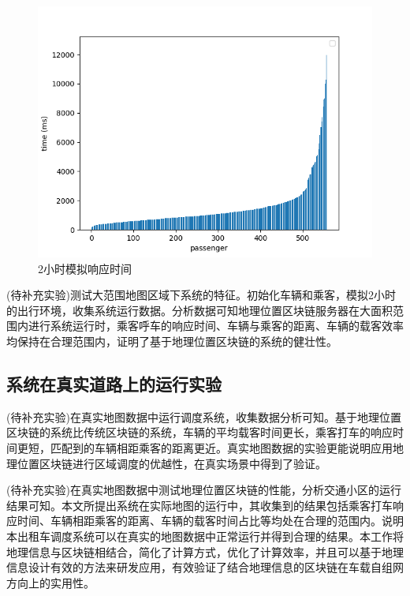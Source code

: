 \begin{figure}
  \centering
  \includegraphics[width=1.0\textwidth]{figures/2hTime}
  \caption{2小时模拟响应时间}\label{fig:2hTime}
\end{figure}

(待补充实验)测试大范围地图区域下系统的特征。初始化车辆和乘客，模拟2小时的出行环境，收集系统运行数据。分析数据可知地理位置区块链服务器在大面积范围内进行系统运行时，乘客呼车的响应时间、车辆与乘客的距离、车辆的载客效率均保持在合理范围内，证明了基于地理位置区块链的系统的健壮性。

\subsection{系统在真实道路上的运行实验}
(待补充实验)在真实地图数据中运行调度系统，收集数据分析可知。基于地理位置区块链的系统比传统区块链的系统，车辆的平均载客时间更长，乘客打车的响应时间更短，匹配到的车辆相距乘客的距离更近。真实地图数据的实验更能说明应用地理位置区块链进行区域调度的优越性，在真实场景中得到了验证。


(待补充实验)在真实地图数据中测试地理位置区块链的性能，分析交通小区的运行结果可知。本文所提出系统在实际地图的运行中，其收集到的结果包括乘客打车响应时间、车辆相距乘客的距离、车辆的载客时间占比等均处在合理的范围内。说明本出租车调度系统可以在真实的地图数据中正常运行并得到合理的结果。本工作将地理信息与区块链相结合，简化了计算方式，优化了计算效率，并且可以基于地理信息设计有效的方法来研发应用，有效验证了结合地理信息的区块链在车载自组网方向上的实用性。

